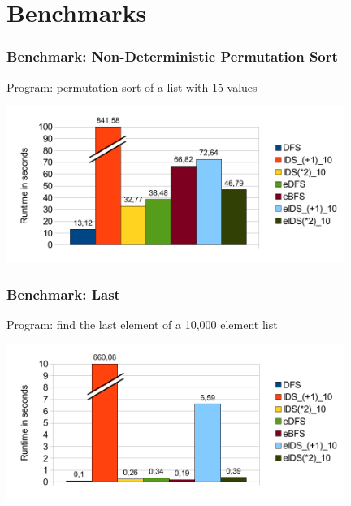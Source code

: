 \documentclass[
,hyperref={pdfpagelabels=false}
]{beamer}
\newcommand{\todo}[1]{\fbox{\sc To do: #1}}
\begin{document}
\section{Benchmarks}

\begin{frame}%
\frametitle{Benchmark: Non-Deterministic Permutation Sort}
Program: permutation sort of a list with 15 values
\begin{center}
\includegraphics[width=11cm]{gfx/permsort}
\end{center}
\end{frame}

\begin{frame}[fragile]%
\frametitle{Benchmark: Last}
Program: find the last element of a 10,000 element list
\begin{center}
\includegraphics[width=11cm]{gfx/last}
\end{center}
\end{frame}
\end{document}
